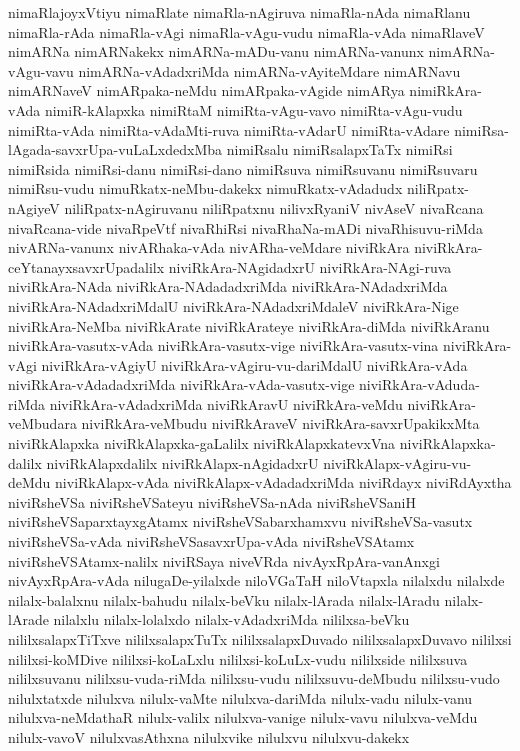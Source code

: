 {nimaRlajoyxVtiyu
nimaRlate
nimaRla-nAgiruva
nimaRla-nAda
nimaRlanu
nimaRla-rAda
nimaRla-vAgi
nimaRla-vAgu-vudu
nimaRla-vAda
nimaRlaveV
nimARNa
nimARNakekx
nimARNa-mADu-vanu
nimARNa-vanunx
nimARNa-vAgu-vavu
nimARNa-vAdadxriMda
nimARNa-vAyiteMdare
nimARNavu
nimARNaveV
nimARpaka-neMdu
nimARpaka-vAgide
nimARya
nimiRkAra-vAda
nimiR-kAlapxka
nimiRtaM
nimiRta-vAgu-vavo
nimiRta-vAgu-vudu
nimiRta-vAda
nimiRta-vAdaMti-ruva
nimiRta-vAdarU
nimiRta-vAdare
nimiRsa-lAgada-savxrUpa-vuLaLxdedxMba
nimiRsalu
nimiRsalapxTaTx
nimiRsi
nimiRsida
nimiRsi-danu
nimiRsi-dano
nimiRsuva
nimiRsuvanu
nimiRsuvaru
nimiRsu-vudu
nimuRkatx-neMbu-dakekx
nimuRkatx-vAdadudx
niliRpatx-nAgiyeV
niliRpatx-nAgiruvanu
niliRpatxnu
nilivxRyaniV
nivAseV
nivaRcana
nivaRcana-vide
nivaRpeVtf
nivaRhiRsi
nivaRhaNa-mADi
nivaRhisuvu-riMda
nivARNa-vanunx
nivARhaka-vAda
nivARha-veMdare
niviRkAra
niviRkAra-ceYtanayxsavxrUpadalilx
niviRkAra-NAgidadxrU
niviRkAra-NAgi-ruva
niviRkAra-NAda
niviRkAra-NAdadadxriMda
niviRkAra-NAdadxriMda
niviRkAra-NAdadxriMdalU
niviRkAra-NAdadxriMdaleV
niviRkAra-Nige
niviRkAra-NeMba
niviRkArate
niviRkArateye
niviRkAra-diMda
niviRkAranu
niviRkAra-vasutx-vAda
niviRkAra-vasutx-vige
niviRkAra-vasutx-vina
niviRkAra-vAgi
niviRkAra-vAgiyU
niviRkAra-vAgiru-vu-dariMdalU
niviRkAra-vAda
niviRkAra-vAdadadxriMda
niviRkAra-vAda-vasutx-vige
niviRkAra-vAduda-riMda
niviRkAra-vAdadxriMda
niviRkAravU
niviRkAra-veMdu
niviRkAra-veMbudara
niviRkAra-veMbudu
niviRkAraveV
niviRkAra-savxrUpakikxMta
niviRkAlapxka
niviRkAlapxka-gaLalilx
niviRkAlapxkatevxVna
niviRkAlapxka-dalilx
niviRkAlapxdalilx
niviRkAlapx-nAgidadxrU
niviRkAlapx-vAgiru-vu-deMdu
niviRkAlapx-vAda
niviRkAlapx-vAdadadxriMda
niviRdayx
niviRdAyxtha
niviRsheVSa
niviRsheVSateyu
niviRsheVSa-nAda
niviRsheVSaniH
niviRsheVSaparxtayxgAtamx
niviRsheVSabarxhamxvu
niviRsheVSa-vasutx
niviRsheVSa-vAda
niviRsheVSasavxrUpa-vAda
niviRsheVSAtamx
niviRsheVSAtamx-nalilx
niviRSaya
niveVRda
nivAyxRpAra-vanAnxgi
nivAyxRpAra-vAda
nilugaDe-yilalxde
niloVGaTaH
niloVtapxla
nilalxdu
nilalxde
nilalx-balalxnu
nilalx-bahudu
nilalx-beVku
nilalx-lArada
nilalx-lAradu
nilalx-lArade
nilalxlu
nilalx-lolalxdo
nilalx-vAdadxriMda
nililxsa-beVku
nililxsalapxTiTxve
nililxsalapxTuTx
nililxsalapxDuvado
nililxsalapxDuvavo
nililxsi
nililxsi-koMDive
nililxsi-koLaLxlu
nililxsi-koLuLx-vudu
nililxside
nililxsuva
nililxsuvanu
nililxsu-vuda-riMda
nililxsu-vudu
nililxsuvu-deMbudu
nililxsu-vudo
nilulxtatxde
nilulxva
nilulx-vaMte
nilulxva-dariMda
nilulx-vadu
nilulx-vanu
nilulxva-neMdathaR
nilulx-valilx
nilulxva-vanige
nilulx-vavu
nilulxva-veMdu
nilulx-vavoV
nilulxvasAthxna
nilulxvike
nilulxvu
nilulxvu-dakekx
}
